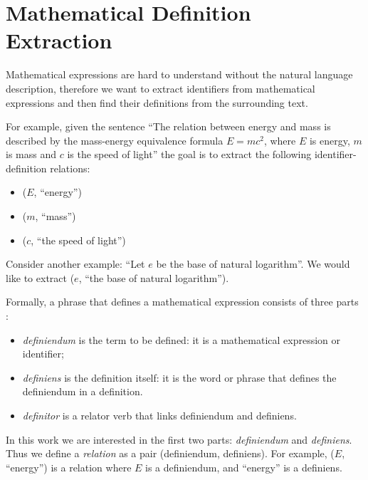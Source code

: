 \section{Mathematical Definition Extraction} \label{sec:definitionextraction-top}

Mathematical expressions are hard to understand without the natural language description,
therefore we want to extract identifiers from mathematical expressions
and then find their definitions from the surrounding text.

For example, given the sentence ``The relation between energy and mass is
described by  the mass-energy equivalence formula $E = mc^2$,
where $E$ is energy, $m$ is mass and $c$ is the speed of light''
the goal is to extract the following identifier-definition relations:

\begin{itemize}
\itemsep1pt\parskip0pt
  \item ($E$, ``energy'')
  \item ($m$, ``mass'')
  \item ($c$, ``the speed of light'')
\end{itemize}

Consider another example: ``Let $e$ be the base of natural logarithm''.
We would like to extract ($e$, ``the base of natural logarithm'').

Formally, a phrase that defines a mathematical expression consists of three parts \cite{kristianto2012extracting}:

\begin{itemize}
\itemsep1pt\parskip0pt
  \item \emph{definiendum} is the term to be defined: it is a mathematical expression or identifier;
  \item \emph{definiens} is the definition itself: it is the word or phrase that defines the definiendum in a definition.
  \item \emph{definitor} is a relator verb that links definiendum and definiens.
\end{itemize}


In this work we are interested in the first two parts: \emph{definiendum} and
\emph{definiens}. Thus we define a \emph{relation} as a pair
(definiendum, definiens). For example, ($E$, ``energy'') is a relation where
$E$ is a definiendum, and ``energy'' is a definiens.




